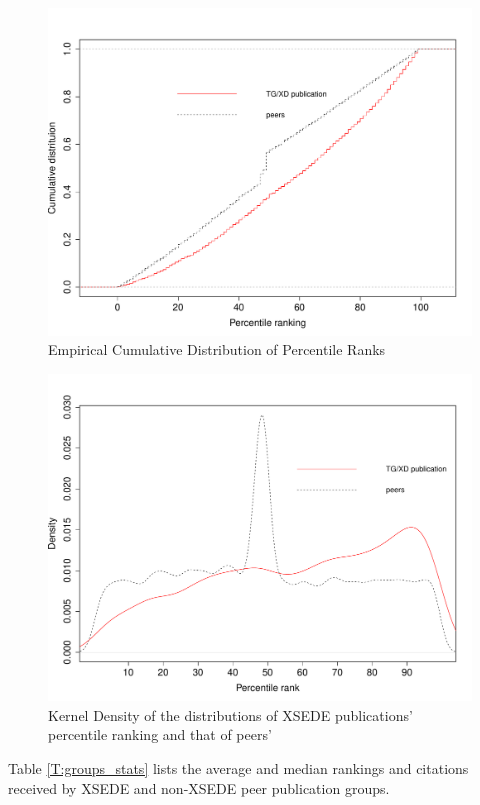 \documentclass{sig-alternate}
\begin{document}
\begin{figure}[htb!]
    \includegraphics[width=0.95\columnwidth]{images/ptranking_CDF.pdf}
    \caption{Empirical Cumulative Distribution of Percentile Ranks}
    \label{F:ptranking_cdf}
\end{figure}

\begin{figure}[htb!]
    \includegraphics[width=0.95\columnwidth]{images/ptranking_distribution.pdf}
    \caption{Kernel Density of the distributions
of XSEDE publications' percentile ranking and that of peers'}
    \label{F:xd_peers_density}
\end{figure}

Table \ref{T:groups_stats} lists the average and median rankings and
citations received by XSEDE and non-XSEDE peer publication groups.
\end{document}
